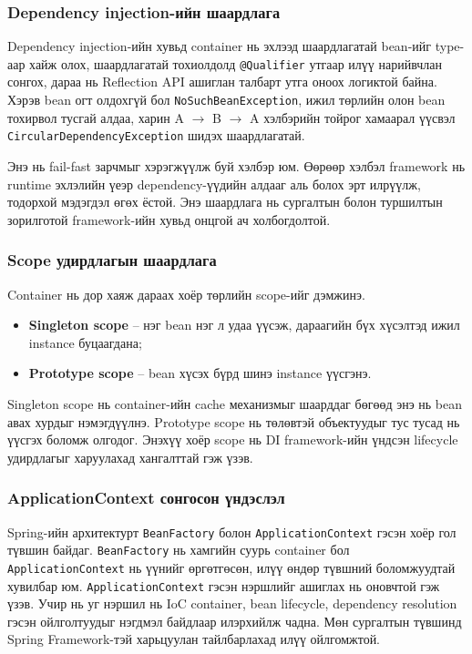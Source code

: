 \subsubsection{Dependency injection-ийн шаардлага}

Dependency injection-ийн хувьд container нь эхлээд шаардлагатай bean-ийг type-аар хайж олох, шаардлагатай тохиолдолд \texttt{@Qualifier} утгаар илүү нарийвчлан сонгох, дараа нь Reflection API ашиглан талбарт утга оноох логиктой байна. Хэрэв bean огт олдохгүй бол \texttt{NoSuchBeanException}, ижил төрлийн олон bean тохирвол тусгай алдаа, харин A $\rightarrow$ B $\rightarrow$ A хэлбэрийн тойрог хамаарал үүсвэл \texttt{CircularDependencyException} шидэх шаардлагатай.

Энэ нь fail-fast зарчмыг хэрэгжүүлж буй хэлбэр юм. Өөрөөр хэлбэл framework нь runtime эхлэлийн үеэр dependency-үүдийн алдааг аль болох эрт илрүүлж, тодорхой мэдэгдэл өгөх ёстой. Энэ шаардлага нь сургалтын болон туршилтын зорилготой framework-ийн хувьд онцгой ач холбогдолтой. 

\subsubsection{Scope удирдлагын шаардлага}

Container нь дор хаяж дараах хоёр төрлийн scope-ийг дэмжинэ.
\begin{itemize}
    \item \textbf{Singleton scope} -- нэг bean нэг л удаа үүсэж, дараагийн бүх хүсэлтэд ижил instance буцаагдана;
    \item \textbf{Prototype scope} -- bean хүсэх бүрд шинэ instance үүсгэнэ.
\end{itemize}

Singleton scope нь container-ийн cache механизмыг шаарддаг бөгөөд энэ нь bean авах хурдыг нэмэгдүүлнэ. Prototype scope нь төлөвтэй объектуудыг тус тусад нь үүсгэх боломж олгодог. Энэхүү хоёр scope нь DI framework-ийн үндсэн lifecycle удирдлагыг харуулахад хангалттай гэж үзэв. 

\subsubsection{ApplicationContext сонгосон үндэслэл}

Spring-ийн архитектурт \texttt{BeanFactory} болон \texttt{ApplicationContext} гэсэн хоёр гол түвшин байдаг. \texttt{BeanFactory} нь хамгийн суурь container бол \texttt{ApplicationContext} нь үүнийг өргөтгөсөн, илүү өндөр түвшний боломжуудтай хувилбар юм. \texttt{ApplicationContext} гэсэн нэршлийг ашиглах нь оновчтой гэж үзэв. Учир нь уг нэршил нь IoC container, bean lifecycle, dependency resolution гэсэн ойлголтуудыг нэгдмэл байдлаар илэрхийлж чадна. Мөн сургалтын түвшинд Spring Framework-тэй харьцуулан тайлбарлахад илүү ойлгомжтой. 
